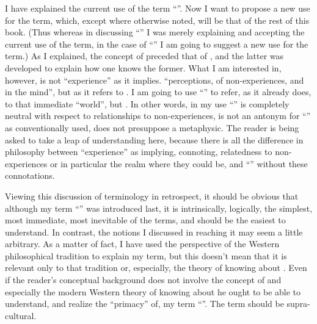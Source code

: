 I have explained the current use of the term \enquote{}. Now I want to propose a new use for the term, which, except where otherwise noted, will be that of the rest of this book. (Thus whereas in discussing \enquote{} I was merely explaining and accepting the current use of the term, in the case of \enquote{} I am going to suggest a new use for the term.) As I explained, the concept of  preceded that of , and the latter was developed to explain how one knows the former. What I am interested in, however, is not \enquote{experience} as it implies. \enquote{perceptions, of non-experiences, and in the mind}, but as it refers to . I am going to use \enquote{} to refer, as it already does, to that immediate \enquote{world}, but . In other words, in my use \enquote{} is completely neutral with respect to relationships to non-experiences, is not an antonym for \enquote{} as conventionally used, does not presuppose a metaphysic. The reader is being asked to take a leap of understanding here, because there is all the difference in philosophy between \enquote{experience} as implying, connoting, relatedness to non-experiences or in particular the realm where they could be, and \enquote{} without these connotations. 

Viewing this discussion of terminology in retrospect, it should be obvious that although my term \enquote{} was introduced last, it is intrinsically, logically, the simplest, most immediate, most inevitable of the terms, and should be the easiest to understand. In contrast, the notions I discussed in reaching it may seem a little arbitrary. As a matter of fact, I have used the perspective of the Western philosophical tradition to explain my term, but this doesn't mean that it is relevant only to that tradition or, especially, the theory of knowing about . Even if the reader's conceptual background does not involve the concept of  and especially the modern Western theory of knowing about  he ought to be able to understand, and realize the \enquote{primacy} of, my term \enquote{}. The term should be supra-cultural. 

